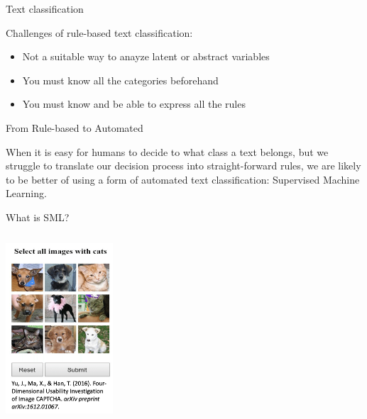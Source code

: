 \documentclass[compress]{beamer}
\begin{document}
\begin{frame}[fragile]{Text classification}
	
\begin{alertblock}{Challenges of rule-based text classification:}
	\begin{itemize}
	\item Not a suitable way to anayze latent or abstract variables 
	\pause
	\item You must know all the categories beforehand
	\pause
	\item You must know and be able to express all the rules
	\end{itemize}

\end{alertblock}
\end{frame}


\begin{frame}{From Rule-based to Automated}
	
When it is easy for humans to decide to what class a text belongs, but we struggle to translate our decision process into straight-forward rules, we are likely to be better of using a form of automated text classification: Supervised Machine Learning.
	
\end{frame}


\begin{frame}{What is SML?}
	
\begin{center}
	\includegraphics[width=4cm, height=7cm]{../pictures/CAPTCHA.png} 
\end{center}
\end{frame}
\end{document}
